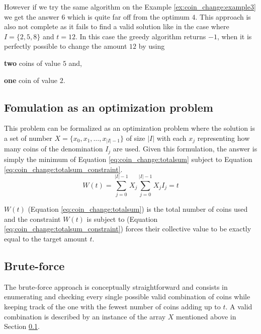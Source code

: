 However if we try the same algorithm on the Example \ref{ex:coin_change:example3} we get the answer $6$ which is quite far off from the optimum $4$. 
This approach is also not complete as it fails to find a valid solution like in the case where $I=\{2,5,8\}$ and $t=12$. In this case the greedy algorithm returns $-1$, when it is perfectly possible to change the amount $12$ by using 
\begin{itemize*}
	\item \textbf{two} coins of value $5$ and,
	\item \textbf{one} coin of value $2$.
\end{itemize*}	





\subsection{Fomulation as an optimization problem}
\label{coin_change:sec:mathdefinition}
This problem can be formalized as an optimization problem where the solution is a set of number $X=\{x_0,x_1,\ldots, x_{|I|-1}\}$ of size $|I|$ with each $x_j$ representing how many coins of the denomination $I_j$ are used. 
Given this formulation, the answer is simply the minimum of Equation \ref{eq:coin_change:totalsum} subject to Equation \ref{eq:coin_change:totalsum_constraint}.
\begin{subequations}
\begin{equation}
	W(t) = \sum_{j=0}^{|I|-1} X_j
	\label{eq:coin_change:totalsum}
\end{equation}

\begin{equation}
	\sum_{j=0}^{|I|-1} X_j I_j = t
	\label{eq:coin_change:totalsum_constraint}
\end{equation}
\end{subequations}

$W(t)$ (Equation \ref{eq:coin_change:totalsum}) is the total  number of coins used and the constraint $W(t)$ is subject to (Equation \ref{eq:coin_change:totalsum_constraint}) forces their collective value to be exactly equal to the target amount $t$.

\subsection{Brute-force}
\label{coin_change:sec:bruteforce}
The brute-force approach is conceptually straightforward and consists in enumerating and checking every single possible valid combination of coins
while keeping track of the one with the fewest number of coins adding up to $t$.
A valid combination is described by an instance of the  array $X$ mentioned above in Section \ref{coin_change:sec:mathdefinition}.

